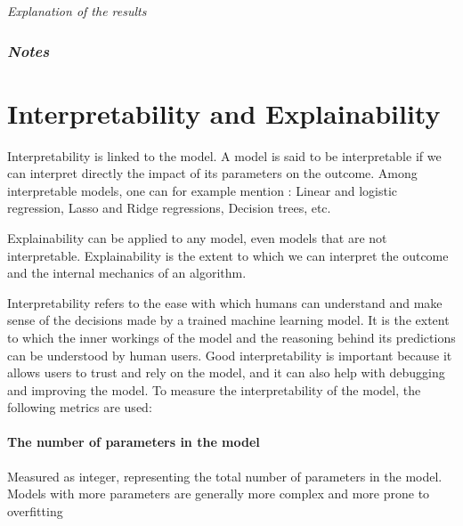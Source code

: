 \textit{Explanation of the results}

\subsubsection*{\textit{Notes}}



\section{Interpretability and Explainability}



Interpretability is linked to the model. A model is said to be interpretable if we can interpret
directly the impact of its parameters on the outcome. Among interpretable models, one can for
example mention : Linear and logistic regression, Lasso and Ridge regressions, Decision trees, etc.

Explainability can be applied to any model, even models that are not interpretable.
Explainability is the extent to which we can interpret the outcome and the internal mechanics of
an algorithm.


Interpretability refers to the ease with which humans can understand and make sense of the
decisions made by a trained machine learning model. \cite[p.
16]{siebert_constructionqualitymodel_} It is the extent to which the inner workings of the model
and the reasoning behind its predictions can be understood by human users. Good interpretability
is important because it allows users to trust and rely on the model, and it can also help with
debugging and improving the model.
To measure the interpretability of the model, the following metrics are used:

\paragraph*{The number of parameters in the model}
Measured as integer, representing the total number of parameters in the model.
Models with more parameters are generally more complex and more prone to overfitting

